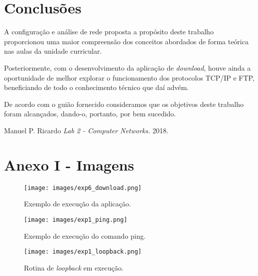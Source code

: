 \documentclass[a4paper, 11pt]{article}
\begin{document}
\section{Conclusões}

A configuração e análise de rede proposta a propósito deste trabalho proporcionou uma maior compreensão dos conceitos abordados de forma teórica nas aulas da unidade curricular. 

Posteriormente, com o desenvolvimento da aplicação de \textit{download}, houve ainda a oportunidade de melhor explorar o funcionamento dos protocolos TCP/IP e FTP, beneficiando de todo o conhecimento técnico que daí advém.

De acordo com o guião fornecido consideramos que os objetivos deste trabalho foram alcançados, dando-o, portanto, por bem sucedido.


\begin{thebibliography}{1}
   Manuel P. Ricardo {\em Lab 2 - Computer Networks.} 2018.
\end{thebibliography}

\newenvironment{changemargin}[2]{%
\begin{list}{}{%
\setlength{\topsep}{0pt}%
\setlength{\leftmargin}{#1}%
\setlength{\rightmargin}{#2}%
\setlength{\listparindent}{\parindent}%
\setlength{\itemindent}{\parindent}%
\setlength{\parsep}{\parskip}%
}%
\item[]}{
\end{list}}

\newpage
\section{Anexo I - Imagens}

\begin{figure}[H]
\centering
\texttt{[image: images/exp6\_download.png]}
\caption{Exemplo de execução da aplicação.}
\end{figure}

\hfill

\begin{figure}[ht]
\centering
\texttt{[image: images/exp1\_ping.png]}
\caption{Exemplo de execução do comando ping.}
\end{figure}

\hfill

\begin{figure}[H]
\centering
\texttt{[image: images/exp1\_loopback.png]}
\caption{Rotina de \textit{loopback} em execução.}
\end{figure}
\end{document}
